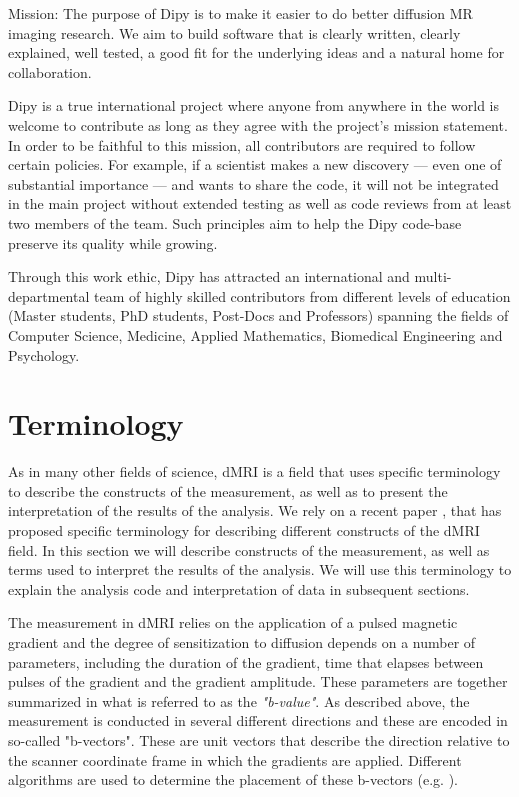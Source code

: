 \documentclass{bioinfo}
\begin{document}
Mission: The purpose of Dipy is to make it easier to do better diffusion MR
imaging research. We aim to build software that is clearly written, clearly
explained, well tested, a good fit for the underlying ideas and a natural home
for collaboration.

Dipy is a true international project where anyone from anywhere in the world
is welcome to contribute as long as they agree with the project's mission
statement. In order to be faithful to this mission, all contributors are
required to follow certain policies. For example, if a scientist makes a new
discovery --- even one of substantial importance --- and wants to share the code,
it will not be integrated in the main project without extended testing as well
as code reviews from at least two members of the team.  Such principles
aim to help the Dipy code-base preserve its quality while growing.

Through this work ethic, Dipy has attracted an international and
multi-departmental team of highly skilled contributors from different levels
of education (Master students, PhD students, Post-Docs and Professors)
spanning the fields of Computer Science, Medicine, Applied Mathematics,
Biomedical Engineering and Psychology.


\section{Terminology}

As in many other fields of science, dMRI is a field that uses specific
terminology to describe the constructs of the measurement, as well as to
present the interpretation of the results of the analysis. We rely on a recent
paper \citep{Cote2013tractometer}, that has proposed specific terminology for
describing different constructs of the dMRI field. In this section we will
describe constructs of the measurement, as well as terms used to interpret
the results of the analysis. We will use this terminology to explain the
analysis code and interpretation of data in subsequent sections.

The measurement in dMRI relies on the application of a pulsed magnetic
gradient and the degree of sensitization to diffusion depends on a number of
parameters, including the duration of the gradient, time that elapses between
pulses of the gradient and the gradient amplitude. These parameters are
together summarized in what is referred to as the \emph{"b-value"}.  As described
above, the measurement is conducted in several different directions and these
are encoded in so-called "b-vectors". These are unit vectors that describe the
direction relative to the scanner coordinate frame in which the gradients are
applied. Different algorithms are used to determine the placement of these b-vectors
 (e.g. \citep{jones-etal:99}).
\end{document}
